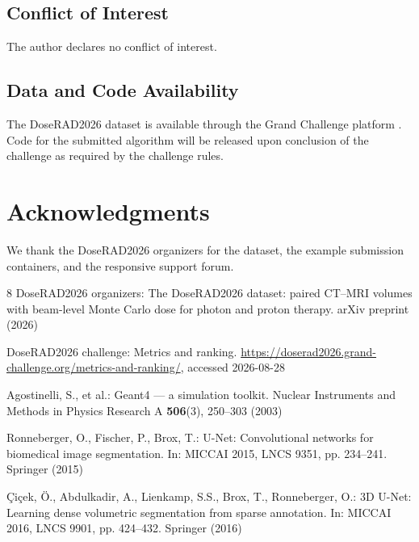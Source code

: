 \documentclass[runningheads]{llncs}
\begin{document}
\subsection*{Conflict of Interest}
The author declares no conflict of interest.

\subsection*{Data and Code Availability}
The DoseRAD2026 dataset is available through the Grand Challenge platform \cite{doserad_data}. Code for the submitted algorithm will be released upon conclusion of the challenge as required by the challenge rules.

\section*{Acknowledgments}
We thank the DoseRAD2026 organizers for the dataset, the example submission containers, and the responsive support forum.

\begin{thebibliography}{8}
DoseRAD2026 organizers: The DoseRAD2026 dataset: paired CT--MRI volumes with beam-level Monte Carlo dose for photon and proton therapy. arXiv preprint  (2026)

DoseRAD2026 challenge: Metrics and ranking. \url{https://doserad2026.grand-challenge.org/metrics-and-ranking/}, accessed 2026-08-28

Agostinelli, S., et al.: Geant4 --- a simulation toolkit. Nuclear Instruments and Methods in Physics Research A \textbf{506}(3), 250--303 (2003)

Ronneberger, O., Fischer, P., Brox, T.: U-Net: Convolutional networks for biomedical image segmentation. In: MICCAI 2015, LNCS 9351, pp. 234--241. Springer (2015)

\c{C}i\c{c}ek, \"O., Abdulkadir, A., Lienkamp, S.S., Brox, T., Ronneberger, O.: 3D U-Net: Learning dense volumetric segmentation from sparse annotation. In: MICCAI 2016, LNCS 9901, pp. 424--432. Springer (2016)
\end{thebibliography}
\end{document}
